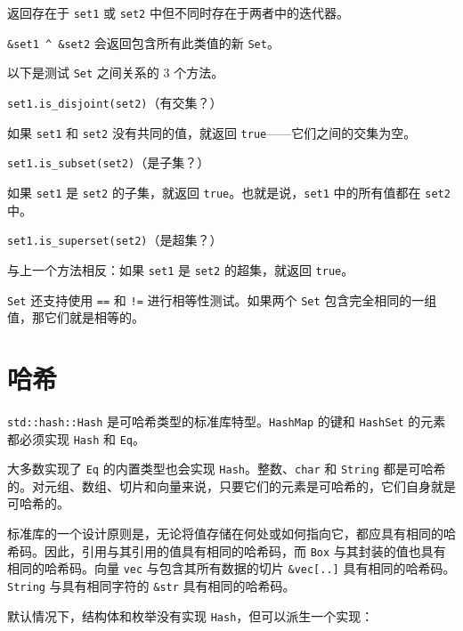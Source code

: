 返回存在于 \texttt{set1} 或 \texttt{set2} 中但不同时存在于两者中的迭代器。

\texttt{\&set1 \textasciicircum{} \&set2} 会返回包含所有此类值的新 \texttt{Set}。

以下是测试 \texttt{Set} 之间关系的 3 个方法。

\begin{myNote}
\texttt{set1.is\_disjoint(set2)}（有交集？）
\end{myNote}

如果 \texttt{set1} 和 \texttt{set2} 没有共同的值，就返回 \texttt{true}——它们之间的交集为空。

\begin{mySidenote}
\texttt{set1.is\_subset(set2)}（是子集？）
\end{mySidenote}

如果 \texttt{set1} 是 \texttt{set2} 的子集，就返回 \texttt{true}。也就是说，\texttt{set1} 中的所有值都在 \texttt{set2} 中。

\begin{myNote}
\texttt{set1.is\_superset(set2)}（是超集？）
\end{myNote}

与上一个方法相反：如果 \texttt{set1} 是 \texttt{set2} 的超集，就返回 \texttt{true}。

\texttt{Set} 还支持使用 \texttt{==} 和 \texttt{!=} 进行相等性测试。如果两个 \texttt{Set} 包含完全相同的一组值，那它们就是相等的。

\section{哈希}

\texttt{std::hash::Hash} 是可哈希类型的标准库特型。\texttt{HashMap} 的键和 \texttt{HashSet} 的元素都必须实现 \texttt{Hash} 和 \texttt{Eq}。

大多数实现了 \texttt{Eq} 的内置类型也会实现 \texttt{Hash}。整数、\texttt{char} 和 \texttt{String} 都是可哈希的。对元组、数组、切片和向量来说，只要它们的元素是可哈希的，它们自身就是可哈希的。

标准库的一个设计原则是，无论将值存储在何处或如何指向它，都应具有相同的哈希码。因此，引用与其引用的值具有相同的哈希码，而 \texttt{Box} 与其封装的值也具有相同的哈希码。向量 \texttt{vec} 与包含其所有数据的切片 \texttt{\&vec[..]} 具有相同的哈希码。\texttt{String} 与具有相同字符的 \texttt{\&str} 具有相同的哈希码。

默认情况下，结构体和枚举没有实现 \texttt{Hash}，但可以派生一个实现：

